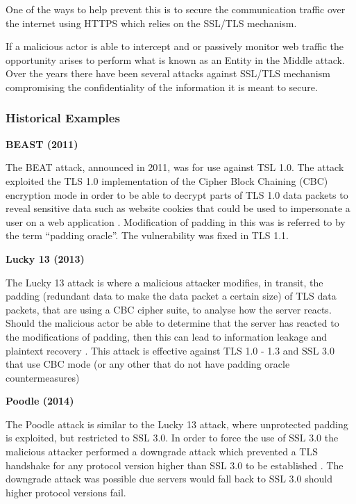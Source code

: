 \documentclass{mscreport}
\begin{document}
\vspace{0.3cm} \noindent
One of the ways to help prevent this is to secure the communication traffic over the internet using HTTPS which relies on the SSL/TLS mechanism.

\vspace{0.3cm} \noindent
If a malicious actor is able to intercept and or passively monitor web traffic the opportunity arises to perform what is known as an Entity in the Middle attack. Over the years there have been several attacks against SSL/TLS mechanism compromising the confidentiality of the information it is meant to secure.

\subsubsection{Historical Examples}
\textbf{BEAST (2011)}

\vspace{0.2cm} \noindent
The BEAT attack, announced in 2011, was for use against TSL 1.0. The attack exploited the TLS 1.0 implementation of the Cipher Block Chaining (CBC) encryption mode in order to be able to decrypt parts of TLS 1.0 data packets to reveal sensitive data such as website cookies that could be used to impersonate a user on a web application \cite{Ristic2017-aj,Levillain2015-os}. Modification of padding in this was is referred to by the term “padding oracle”. The vulnerability was fixed in TLS 1.1.

\vspace{0.6cm} \noindent
\textbf{Lucky 13 (2013)}


\vspace{0.2cm} \noindent
The Lucky 13 attack is where a malicious attacker modifies, in transit, the padding (redundant data to make the data packet a certain size) of TLS data packets, that are using a CBC cipher suite, to analyse how the server reacts. Should the malicious actor be able to determine that the server has reacted to the modifications of padding, then this can lead to information leakage and plaintext recovery \cite{Ristic2017-aj,Al_Fardan2013-sw}. This attack is effective against TLS 1.0 - 1.3 and SSL 3.0 that use CBC mode (or any other that do not have padding oracle countermeasures)

\vspace{0.6cm} \noindent
\textbf{Poodle (2014)}


\vspace{0.2cm} \noindent
The Poodle attack is similar to the Lucky 13 attack, where unprotected padding is exploited, but restricted to SSL 3.0. In order to force the use of SSL 3.0 the malicious attacker performed a downgrade attack which prevented a TLS handshake for any protocol version higher than SSL 3.0 to be established \cite{Ristic2017-aj,Al_Fardan2013-sw}. The downgrade attack was possible due servers would fall back to SSL 3.0 should higher protocol versions fail.
\end{document}
